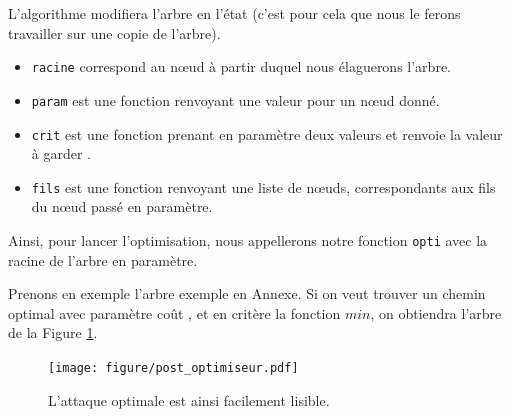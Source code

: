 		L'algorithme modifiera l'arbre en l'état (c'est pour cela que nous le ferons travailler sur une copie de l'arbre).
		\begin{itemize}
			\item \verb|racine| correspond au nœud à partir duquel nous élaguerons l'arbre.
			\item \verb|param| est une fonction renvoyant une valeur pour un nœud donné.
			\item \verb|crit| est une fonction prenant en paramètre deux valeurs et renvoie la valeur à \og garder \fg.
			\item \verb|fils| est une fonction renvoyant une liste de nœuds, correspondants aux fils du nœud passé en paramètre.
		\end{itemize}
		Ainsi, pour lancer l'optimisation, nous appellerons notre fonction \verb|opti| avec la racine de l'arbre en paramètre.

		Prenons en exemple l'arbre exemple en Annexe. %
		Si on veut trouver un chemin optimal avec paramètre \og coût \fg, et en critère la fonction $min$, on obtiendra l'arbre de la Figure \ref{fig:arbre_post_opti}.

		\begin{figure}[h!]
			\centering
			\texttt{[image: figure/post\_optimiseur.pdf]}
			\caption{L'attaque optimale est ainsi facilement lisible.}
			\label{fig:arbre_post_opti}
		\end{figure}
